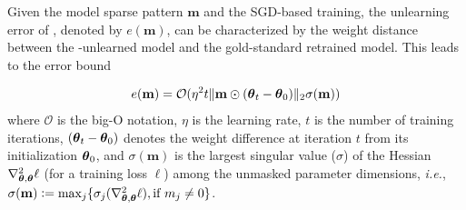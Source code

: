 \begin{myprop}
\label{prop: SGD_sparse_MU}
Given the model sparse pattern $\mathbf m$ and the SGD-based  training, the unlearning error   of  {\GA}, denoted by $e(\mathbf m)$, can be characterized by the weight distance
between the {\GA}-unlearned model and the gold-standard retrained model. This leads to the error bound
\iffalse 
and 
 \underline{$ e_{\Omega_{\mathbf m}}(\btheta_0, \{ \hat{\mathbf z}_i \},  t, \eta) $}, where
 $e_{\Omega_{\mathbf m}}$ 
signifies the subvector of $e$ in \eqref{eq: err_MU_SGD} with coordinates given by the unmasked index set $\Omega_m$,  and $\Omega_{\mathbf{m}} = \{ i: m_i = 1 \}$ is the index set of unmasked parameters.
\fi 
%
%
\iffalse
  $  e^\prime(\btheta_0^\prime, \{ \hat{\mathbf z}_i \},  t, \eta) \Def \mathbf m \odot e(\btheta_0, \{ \hat{\mathbf z}_i \},  t, \eta) $, where $e$ is  defined in  \eqref{eq: err_MU_SGD}.  
  \fi 

\vspace*{-5mm}
{\small\begin{align}
  e(\mathbf m) = \mathcal{O}(\eta^2 t  \| 
   \mathbf m \odot (\boldsymbol{\theta}_t - \boldsymbol{\theta}_0) \|_2 \sigma(\mathbf m) )
   \label{eq: err_bd_SGD_sparse}
\end{align}}%
where $\mathcal O$ is the big-O notation, $\eta$ is the learning rate, 
$t$ is the number of   training iterations, 
$ (\boldsymbol{\theta}_t - \boldsymbol{\theta}_0)$ denotes the weight difference at iteration $t$ from its   initialization $\boldsymbol{\theta}_0$,  and
$\sigma(\mathbf m)  $ is the largest singular value ($\sigma$) of the  Hessian $\nabla_{\boldsymbol{\theta},\boldsymbol{\theta}}^2\ell$ (for a training loss $\ell$)   among the  unmasked parameter dimensions, \textit{i.e.}, $\sigma(\mathbf m) \mathrel{\mathop:}= \max_{j} \{  \sigma_{j}( \nabla_{\boldsymbol{\theta},\boldsymbol{\theta}}^2\ell ), \text{if } m_j \neq 0  \}$.


\end{myprop}
